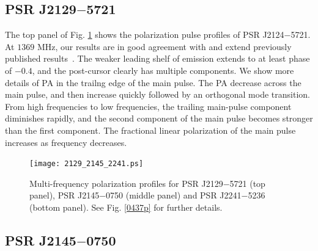 \documentclass[useAMS,usenatbib]{mn2e}
\begin{document}

\subsection{PSR J2129$-$5721}

The top panel of Fig. \ref{2129p} shows the polarization pulse profiles of 
PSR J2124$-$5721.
%
At $1369$ MHz, our results are in good agreement with and extend previously 
published results~\citep{Yan11}.
%
The weaker leading shelf of emission extends to at least phase of $-0.4$, and 
the post-cursor clearly has multiple components.
%
We show more details of PA in the trailng edge of the main pulse.  
%
The PA decrease across the main pulse, and then increase quickly followed 
by an orthogonal mode transition.
%
From high frequencies to low frequencies, the trailing main-pulse component 
diminishes rapidly, and the second component of the main pulse becomes stronger
than the first component.
%
The fractional linear polarization of the main pulse increases as frequency 
decreases.


\begin{figure}
\begin{center}
\texttt{[image: 2129\_2145\_2241.ps]}
\caption{Multi-frequency polarization profiles for PSR J2129$-$5721 (top 
panel), PSR J2145$-$0750 (middle panel) and PSR J2241$-$5236 (bottom panel). 
See Fig. \ref{0437p} for further details.}
\label{2129p}
\end{center}
\end{figure}

\subsection{PSR J2145$-$0750}
\end{document}
